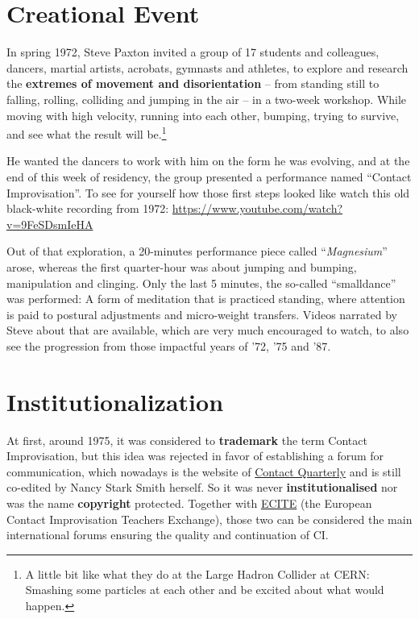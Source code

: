 \section{Creational Event}\label{sec:creational-event}

In spring 1972, Steve Paxton invited a group of 17 students and colleagues, dancers, martial artists, acrobats, gymnasts and athletes, to explore and research the \textbf{extremes of movement and disorientation} -- from standing still to falling, rolling, colliding and jumping in the air -- in a two-week workshop.
While moving with high velocity, running into each other, bumping, trying to survive, and see what the result will be.\footnote{A little bit like what they do at the Large Hadron Collider at CERN: Smashing some particles at each other and be excited about what would happen.}

He wanted the dancers to work with him on the form he was evolving, and at the end of this week of residency, the group presented a performance named ``Contact Improvisation''.
To see for yourself how those first steps looked like watch this old black-white recording from 1972: \url{https://www.youtube.com/watch?v=9FeSDsmIeHA}

Out of that exploration, a 20-minutes performance piece called ``\textit{Magnesium}'' arose, whereas the first quarter-hour was about jumping and bumping, manipulation and clinging.
Only the last 5 minutes, the so-called ``\gls{smalldance}'' was performed: A form of meditation that is practiced standing, where attention is paid to postural adjustments and micro-weight transfers.
Videos narrated by Steve about that are available, which are very much encouraged to watch, to also see the progression from those impactful years of '72, '75 and '87.

\section{Institutionalization}\label{sec:institutionalization}

At first, around 1975, it was considered to \textbf{trademark} the term Contact Improvisation, but this idea was rejected in favor of establishing a forum for communication, which nowadays is the website of \href{https://contactquarterly.com}{Contact Quarterly} and is still co-edited by Nancy Stark Smith herself.
So it was never \textbf{institutionalised} nor was the name \textbf{copyright} protected.
Together with \href{http://www.ecite.org}{ECITE} (the European Contact Improvisation Teachers Exchange), those two can be considered the main international forums ensuring the quality and continuation of CI\@.


